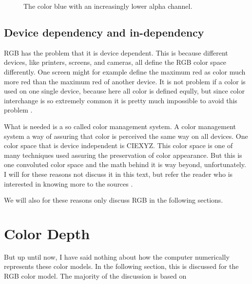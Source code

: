 \begin{figure}
  \centering
  \caption{The color blue with an increasingly lower alpha channel.}
  \label{fig:alpha}
\end{figure}

\subsection{Device dependency and in-dependency}

RGB has the problem that it is device dependent. This is because
different devices, like printers, screens, and cameras, all define the
RGB color space differently. One screen might for example define the
maximum red as color much more red than the maximum red of another
device. It is not problem if a color is used on one single device,
because here all color is defined eqully, but since color interchange
is so extremely common it is pretty much impossible to avoid this
problem
\cite{Pascale2003_ReviewRGBColourSpaces,boutel:_png_portab_networ_graph_specif_version12}.

What is needed is a so called color management system. A color
management system a way of assuring that color is perceived the same
way on all devices. One color space that is device independent is
CIEXYZ. This color space is one of many techniques used assuring the
preservation of color appearance. But this is one convoluted color
space and the math behind it is way beyond, unfortunately. I will for
these reasons not discuss it in this text, but refer the reader who is
interested in knowing more to the sources
\cite{schanda97:_colorimetry,Pascale2003_ReviewRGBColourSpaces,boutel:_png_portab_networ_graph_specif_version12,kerr:_cie_xyz_color_spaces,Fairman_Brill_Hemmendinger_1997}.

We will also for these reasons only discuss RGB in the following
sections.


\newcommand{\rgbtrip}[3]{\mbox{(#1,#2,#3)}}

\section{Color Depth}
\label{sec:color-depth}

But up until now, I have said nothing about how the computer
numerically represents these color models. In the following section,
this is discussed for the RGB color model. The majority of the
discussion is based on \cite{murray1996encyclopedia,neider93:_openg_progr_guide,niederst1999webdesign,sitts2000handbook}

